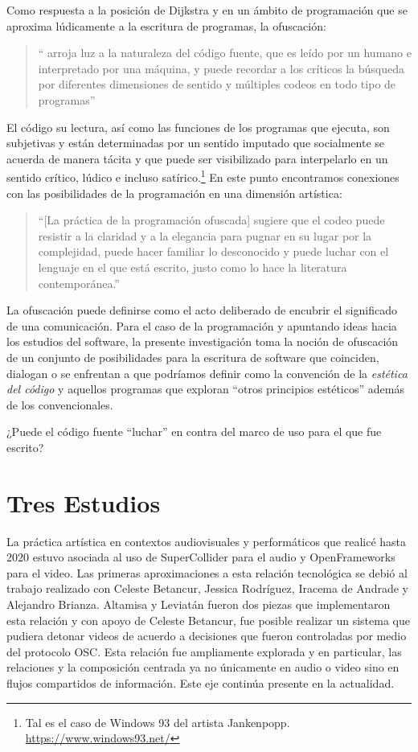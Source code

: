 Como respuesta a la posición de Dijkstra y en un ámbito de programación que se aproxima lúdicamente a la escritura de programas, la ofuscación:

\begin{quote}
`` arroja luz a la naturaleza del código fuente, que es leído por un humano e interpretado por una máquina, y puede recordar a los críticos la búsqueda por diferentes dimensiones de sentido y múltiples codeos en todo tipo de programas''\citep[p.~198]{obfuscatedCode}
\end{quote}

El código su lectura, así como las funciones de los programas que ejecuta, son subjetivas y están determinadas por un sentido imputado que socialmente se acuerda de manera tácita y que puede ser visibilizado para interpelarlo en un sentido crítico, lúdico e incluso satírico.\footnote{Tal es el caso de Windows 93 del artista Jankenpopp. \url{https://www.windows93.net/} } En este punto encontramos conexiones con las posibilidades de la programación en una dimensión artística:

\begin{quote}
``[La práctica de la programación ofuscada] sugiere que el codeo puede resistir a la claridad y a la elegancia para pugnar en su lugar por la complejidad, puede hacer familiar lo desconocido y puede luchar con el lenguaje en el que está escrito, justo como lo hace la literatura contemporánea.''\citep[p.~198]{obfuscatedCode}
\end{quote}

La ofuscación puede definirse como el acto deliberado de encubrir el significado de una comunicación. Para el caso de la programación y apuntando ideas hacia los estudios del software, la presente investigación toma la noción de ofuscación de un conjunto de posibilidades para la escritura de software que coinciden, dialogan o se enfrentan a que podríamos definir como la convención de la \emph{estética del código} \citep{EWD:EWD35} y aquellos programas que exploran ``otros principios estéticos'' \citep{obfuscatedCode} además de los convencionales.

¿Puede el código fuente ``luchar'' en contra del marco de uso para el que fue escrito?

    
\section{Tres Estudios}

La práctica artística en contextos audiovisuales y performáticos que realicé hasta 2020 estuvo asociada al uso de SuperCollider para el audio y OpenFrameworks para el video. Las primeras aproximaciones a esta relación tecnológica se debió al trabajo realizado con Celeste Betancur, Jessica Rodríguez, Iracema de Andrade y Alejandro Brianza. Altamisa y Leviatán fueron dos piezas que implementaron esta relación y con apoyo de Celeste Betancur, fue posible realizar un sistema que pudiera detonar videos de acuerdo a decisiones que fueron controladas por medio del protocolo OSC. Esta relación fue ampliamente explorada y en particular, las relaciones y la composición centrada ya no únicamente en audio o video sino en flujos compartidos de información. Este eje continúa presente en la actualidad.

